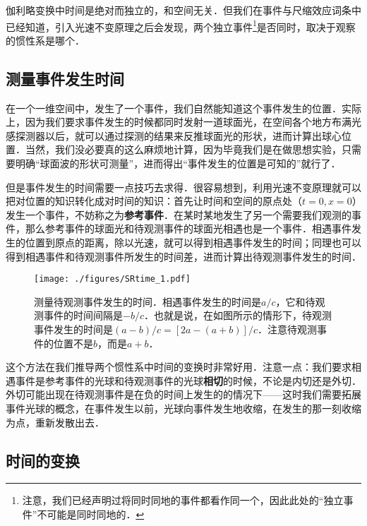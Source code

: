 




伽利略变换中时间是绝对而独立的，和空间无关．但我们在事件与尺缩效应词条中已经知道，引入光速不变原理之后会发现，两个独立事件\footnote{注意，我们已经声明过将同时同地的事件都看作同一个，因此此处的“独立事件”不可能是同时同地的．}是否同时，取决于观察的惯性系是哪个．

\subsection{测量事件发生时间}

在一个一维空间中，发生了一个事件，我们自然能知道这个事件发生的位置．实际上，因为我们要求事件发生的时候都同时发射一道球面光，在空间各个地方布满光感探测器以后，就可以通过探测的结果来反推球面光的形状，进而计算出球心位置．当然，我们没必要真的这么麻烦地计算，因为毕竟我们是在做思想实验，只需要明确“球面波的形状可测量”，进而得出“事件发生的位置是可知的”就行了．

但是事件发生的时间需要一点技巧去求得．很容易想到，利用光速不变原理就可以把对位置的知识转化成对时间的知识：首先让时间和空间的原点处（$t=0, x=0$）发生一个事件，不妨称之为\textbf{参考事件}．在某时某地发生了另一个需要我们观测的事件，那么参考事件的球面光和待观测事件的球面光相遇也是一个事件．相遇事件发生的位置到原点的距离，除以光速，就可以得到相遇事件发生的时间；同理也可以得到相遇事件和待观测事件所发生的时间差，进而计算出待观测事件发生的时间．

\begin{figure}[ht]
\centering
\texttt{[image: ./figures/SRtime\_1.pdf]}
\caption{测量待观测事件发生的时间．相遇事件发生的时间是$a/c$，它和待观测事件的时间间隔是$-b/c$．也就是说，在如图所示的情形下，待观测事件发生的时间是$(a-b)/c=[2a-(a+b)]/c$．注意待观测事件的位置不是$b$，而是$a+b$．} \label{SRtime_fig1}
\end{figure}

这个方法在我们推导两个惯性系中时间的变换时非常好用．注意一点：我们要求相遇事件是参考事件的光球和待观测事件的光球\textbf{相切}的时候，不论是内切还是外切．外切可能出现在待观测事件是在负的时间上发生的的情况下——这时我们需要拓展事件光球的概念，在事件发生以前，光球向事件发生地收缩，在发生的那一刻收缩为点，重新发散出去．

\subsection{时间的变换}

